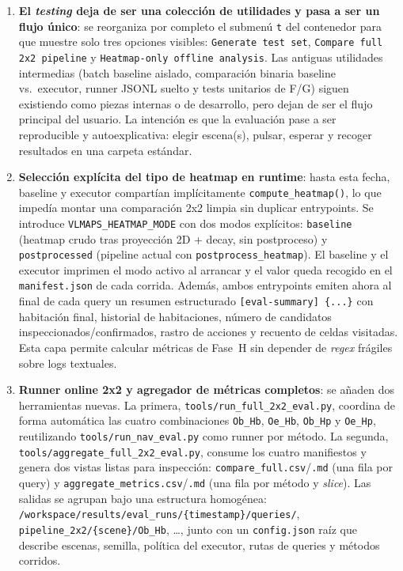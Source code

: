 \begin{enumerate}

  \item \textbf{El \textit{testing} deja de ser una colección de utilidades y
        pasa a ser un flujo único}: se reorganiza por completo el submenú
        \texttt{t} del contenedor para que muestre solo tres opciones visibles:
        \texttt{Generate test set}, \texttt{Compare full 2x2 pipeline} y
        \texttt{Heatmap-only offline analysis}. Las antiguas utilidades
        intermedias (batch baseline aislado, comparación binaria baseline vs.\
        executor, runner JSONL suelto y tests unitarios de F/G) siguen
        existiendo como piezas internas o de desarrollo, pero dejan de ser el
        flujo principal del usuario. La intención es que la evaluación pase a
        ser reproducible y autoexplicativa: elegir escena(s), pulsar, esperar y
        recoger resultados en una carpeta estándar.

  \item \textbf{Selección explícita del tipo de heatmap en runtime}: hasta esta
        fecha, baseline y executor compartían implícitamente
        \texttt{compute\_heatmap()}, lo que impedía montar una comparación 2x2
        limpia sin duplicar entrypoints. Se introduce
        \texttt{VLMAPS\_HEATMAP\_MODE} con dos modos explícitos:
        \texttt{baseline} (heatmap crudo tras proyección 2D + decay, sin
        postproceso) y \texttt{postprocessed} (pipeline actual con
        \texttt{postprocess\_heatmap}). El baseline y el executor imprimen el
        modo activo al arrancar y el valor queda recogido en el
        \texttt{manifest.json} de cada corrida. Además, ambos entrypoints
        emiten ahora al final de cada query un resumen estructurado
        \texttt{[eval-summary] \{...\}} con habitación final, historial de
        habitaciones, número de candidatos inspeccionados/confirmados, rastro
        de acciones y recuento de celdas visitadas. Esta capa permite
        calcular métricas de Fase~H sin depender de \emph{regex} frágiles sobre
        logs textuales.

  \item \textbf{Runner online 2x2 y agregador de métricas completos}: se añaden
        dos herramientas nuevas. La primera,
        \texttt{tools/run\_full\_2x2\_eval.py}, coordina de forma automática las
        cuatro combinaciones \texttt{Ob\_Hb}, \texttt{Oe\_Hb},
        \texttt{Ob\_Hp} y \texttt{Oe\_Hp}, reutilizando
        \texttt{tools/run\_nav\_eval.py} como runner por método. La segunda,
        \texttt{tools/aggregate\_full\_2x2\_eval.py}, consume los cuatro
        manifiestos y genera dos vistas listas para inspección:
        \texttt{compare\_full.csv}/\texttt{.md} (una fila por query) y
        \texttt{aggregate\_metrics.csv}/\texttt{.md} (una fila por método y
        \emph{slice}). Las salidas se agrupan bajo una estructura homogénea:
        \texttt{/workspace/results/eval\_runs/\{timestamp\}/queries/},
        \texttt{pipeline\_2x2/\{scene\}/Ob\_Hb}, \ldots,
        junto con un \texttt{config.json} raíz que describe escenas, semilla,
        política del executor, rutas de queries y métodos corridos.


\end{enumerate}
